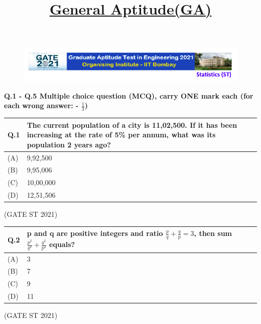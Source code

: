 \documentclass[journal,12pt,onecolumn]{IEEEtran}
\title{\textbf{\underline{General Aptitude(GA)}}}
\author{}
\date{}
\theoremstyle{remark}
\begin{document}
\begin{figure}
 \centering
    \includegraphics[width=1\linewidth]{figs/0.png} 
\end{figure}
\small
\setlength{\tabcolsep}{8pt}
\renewcommand{\arraystretch}{1.2}
\maketitle

\Large\textbf{Q.1 - Q.5 Multiple choice question (MCQ), carry ONE mark each (for each wrong answer: - $\frac{1}{3}$)} 

\bigskip\bigskip\bigskip\bigskip\bigskip\bigskip
\Large\begin{tabular}{|p{1cm}|p{12.5cm}|}
\hline
\textbf{Q.1} & \textbf{The current population of a city is 11,02,500. If it has been increasing at the rate of 5\% per annum, what was its population 2 years ago?} \\
\hline
(A) & 9,92,500 \\
\hline
(B) & 9,95,006 \\
\hline
(C) & 10,00,000 \\
\hline
(D) & 12,51,506 \\
\hline
\end{tabular}

\hfill (GATE ST 2021) 
\\

\bigskip\bigskip\bigskip\bigskip\bigskip\bigskip

\Large\begin{tabular}{|p{1cm}|p{12.5cm}|}

\hline
\textbf{Q.2} & \textbf{p and q are positive integers and ratio $\frac{p}{q} + \frac{q}{p}=3$, then sum $\frac{p^2}{q^2} + \frac{q^2}{p^2}$ equals? } \bigskip \\
\hline
(A) & 3 \\
\hline
(B) & 7 \\
\hline
(C) & 9 \\
\hline
(D) & 11 \\
\hline
\end{tabular}

\hfill (GATE ST 2021)
\\
\end{document}
